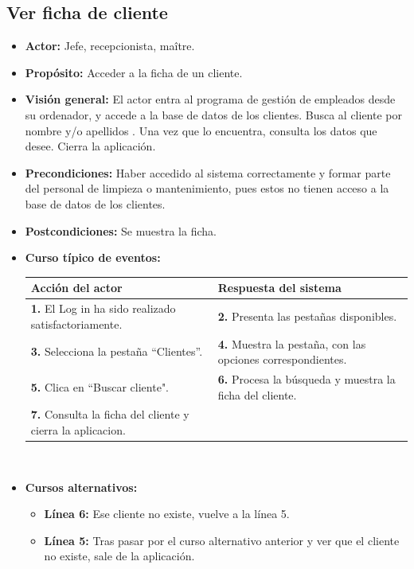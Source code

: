 \documentclass[spanish,a4paper,11pt, twoside]{report}	%
\begin{document}
	\subsection{Ver ficha de cliente}
			\begin{itemize}
			\item \textbf{Actor:} Jefe, recepcionista, maître.
			\item \textbf{Propósito:} Acceder a la ficha de un cliente.
			\item \textbf{Visión general:} El actor entra al programa de gestión de empleados desde su ordenador, y accede a la base de datos de los clientes. Busca al cliente por nombre y/o apellidos . Una vez que lo encuentra, consulta los datos que desee. Cierra la aplicación. 
			\item \textbf{Precondiciones:} Haber accedido al sistema correctamente y formar parte del personal de limpieza o mantenimiento, pues estos no tienen acceso a la base de datos de los clientes.
			\item \textbf{Postcondiciones:} Se muestra la ficha.
			\item \textbf{Curso típico de eventos:} 	\\
				\begin{tabular}{|p{6cm}||p{6cm}|}
				\hline
				\textbf{Acción del actor} & \textbf{Respuesta del sistema} \\ \hline \hline
				\textbf{1.} El Log in ha sido realizado satisfactoriamente. & \textbf{2.} Presenta las pestañas disponibles.\\ \hline
				\textbf{3.} Selecciona la pestaña “Clientes”. & \textbf{4.} Muestra la pestaña, con las opciones correspondientes. \\ \hline
				\textbf{5.} Clica en “Buscar cliente".	& \textbf{6.} Procesa la búsqueda y muestra la ficha del cliente. \\ \hline
				\textbf{7.} Consulta la ficha del cliente y cierra la aplicacion.& \\ \hline
				
			\end{tabular}
			\\
			\item \textbf{Cursos alternativos:} 
			\begin{itemize}
			\item  \textbf{Línea 6:} Ese cliente no existe, vuelve a la línea 5.
			\item  \textbf{Línea 5:} Tras pasar por el curso alternativo anterior y ver que el cliente no existe, sale de la aplicación.
			\end {itemize}
		\end{itemize}
\end{document}
